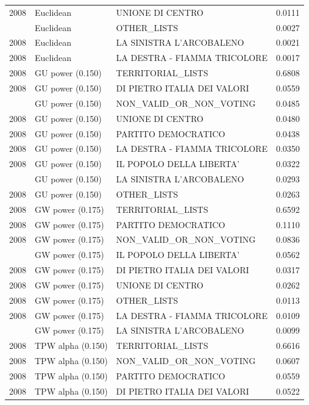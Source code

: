 \begin{longtable}[t]{rllr}
2008 & Euclidean & UNIONE DI CENTRO & 0.0111\\
\addlinespace
2008 & Euclidean & OTHER\_LISTS & 0.0027\\
2008 & Euclidean & LA SINISTRA L'ARCOBALENO & 0.0021\\
2008 & Euclidean & LA DESTRA - FIAMMA TRICOLORE & 0.0017\\
2008 & GU power (0.150) & TERRITORIAL\_LISTS & 0.6808\\
2008 & GU power (0.150) & DI PIETRO ITALIA DEI VALORI & 0.0559\\
\addlinespace
2008 & GU power (0.150) & NON\_VALID\_OR\_NON\_VOTING & 0.0485\\
2008 & GU power (0.150) & UNIONE DI CENTRO & 0.0480\\
2008 & GU power (0.150) & PARTITO DEMOCRATICO & 0.0438\\
2008 & GU power (0.150) & LA DESTRA - FIAMMA TRICOLORE & 0.0350\\
2008 & GU power (0.150) & IL POPOLO DELLA LIBERTA' & 0.0322\\
\addlinespace
2008 & GU power (0.150) & LA SINISTRA L'ARCOBALENO & 0.0293\\
2008 & GU power (0.150) & OTHER\_LISTS & 0.0263\\
2008 & GW power (0.175) & TERRITORIAL\_LISTS & 0.6592\\
2008 & GW power (0.175) & PARTITO DEMOCRATICO & 0.1110\\
2008 & GW power (0.175) & NON\_VALID\_OR\_NON\_VOTING & 0.0836\\
\addlinespace
2008 & GW power (0.175) & IL POPOLO DELLA LIBERTA' & 0.0562\\
2008 & GW power (0.175) & DI PIETRO ITALIA DEI VALORI & 0.0317\\
2008 & GW power (0.175) & UNIONE DI CENTRO & 0.0262\\
2008 & GW power (0.175) & OTHER\_LISTS & 0.0113\\
2008 & GW power (0.175) & LA DESTRA - FIAMMA TRICOLORE & 0.0109\\
\addlinespace
2008 & GW power (0.175) & LA SINISTRA L'ARCOBALENO & 0.0099\\
2008 & TPW alpha (0.150) & TERRITORIAL\_LISTS & 0.6616\\
2008 & TPW alpha (0.150) & NON\_VALID\_OR\_NON\_VOTING & 0.0607\\
2008 & TPW alpha (0.150) & PARTITO DEMOCRATICO & 0.0559\\
2008 & TPW alpha (0.150) & DI PIETRO ITALIA DEI VALORI & 0.0522\\

\end{longtable}
